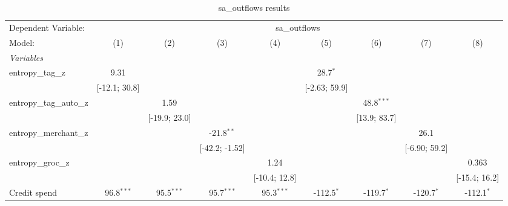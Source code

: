 
\begin{table}[htbp]
   \centering
   \tiny
   \begin{threeparttable}[b]
      \caption{\label{tab:reg_sa_outflows_full} sa\_outflows results}
      \begin{tabular}{lcccccccc}
         \tabularnewline \midrule \midrule
         Dependent Variable: & \multicolumn{8}{c}{sa\_outflows}\\
         Model:                   & (1)             & (2)             & (3)             & (4)             & (5)             & (6)             & (7)             & (8)\\  
         \midrule
         \emph{Variables}\\
         entropy\_tag\_z          & 9.31            &                 &                 &                 & 28.7$^{*}$      &                 &                 &   \\   
                                  & [-12.1; 30.8]   &                 &                 &                 & [-2.63; 59.9]   &                 &                 &   \\   
         entropy\_tag\_auto\_z    &                 & 1.59            &                 &                 &                 & 48.8$^{***}$    &                 &   \\   
                                  &                 & [-19.9; 23.0]   &                 &                 &                 & [13.9; 83.7]    &                 &   \\   
         entropy\_merchant\_z     &                 &                 & -21.8$^{**}$    &                 &                 &                 & 26.1            &   \\   
                                  &                 &                 & [-42.2; -1.52]  &                 &                 &                 & [-6.90; 59.2]   &   \\   
         entropy\_groc\_z         &                 &                 &                 & 1.24            &                 &                 &                 & 0.363\\   
                                  &                 &                 &                 & [-10.4; 12.8]   &                 &                 &                 & [-15.4; 16.2]\\   
         Credit spend             & 96.8$^{***}$    & 95.5$^{***}$    & 95.7$^{***}$    & 95.3$^{***}$    & -112.5$^{*}$    & -119.7$^{*}$    & -120.7$^{*}$    & -112.1$^{*}$\\   

\end{tabular}
\end{threeparttable}
\end{table}

